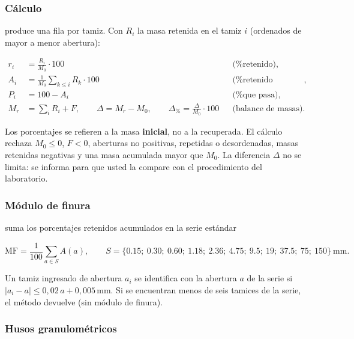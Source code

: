 \subsubsection{Cálculo}

 produce una fila por tamiz. Con $R_i$ la masa retenida
en el tamiz $i$ (ordenados de mayor a menor abertura):

\begin{align}
	r_i &= \frac{R_i}{M_0} \cdot 100 && \text{(\% retenido)}, \\
	A_i &= \frac{1}{M_0} \sum_{k \le i} R_k \cdot 100 && \text{(\% retenido acumulado)}, \\
	P_i &= 100 - A_i && \text{(\% que pasa)}, \\
	M_r &= \sum_i R_i + F, \qquad \Delta = M_r - M_0, \qquad \Delta_{\%} = \frac{\Delta}{M_0} \cdot 100
	&& \text{(balance de masas)}.
\end{align}

Los porcentajes se refieren a la masa \textbf{inicial}, no a la recuperada. El cálculo rechaza $M_0 \le 0$, $F < 0$,
aberturas no positivas, repetidas o desordenadas, masas retenidas negativas y una masa acumulada mayor que $M_0$. La
diferencia $\Delta$ no se limita: se informa para que usted la compare con el procedimiento del laboratorio.

\subsubsection{Módulo de finura}

 suma los porcentajes retenidos acumulados en la serie estándar

\begin{equation}
	\mathrm{MF} = \frac{1}{100} \sum_{a \in S} A(a), \qquad
	S = \{0.15;\ 0.30;\ 0.60;\ 1.18;\ 2.36;\ 4.75;\ 9.5;\ 19;\ 37.5;\ 75;\ 150\}\ \text{mm}.
\end{equation}

Un tamiz ingresado de abertura $a_i$ se identifica con la abertura $a$ de la serie si
$\lvert a_i - a \rvert \le 0{,}02\,a + 0{,}005$\,mm. Si se encuentran menos de seis tamices de la serie, el método
devuelve  (sin módulo de finura).

\subsubsection{Husos granulométricos}

